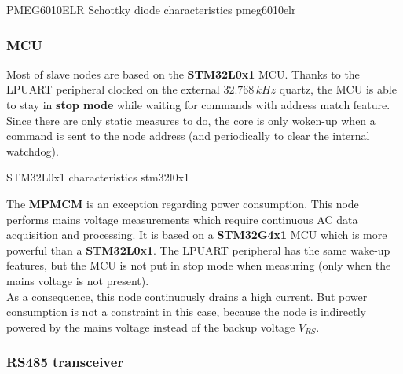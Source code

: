 {PMEG6010ELR Schottky diode characteristics}
{pmeg6010elr}

\subsubsection{MCU}

Most of slave nodes are based on the \textbf{STM32L0x1} MCU. Thanks to the LPUART peripheral clocked on the external $ 32.768\,kHz $ quartz, the MCU is able to stay in \textbf{stop mode} while waiting for commands with address match feature. Since there are only static measures to do, the core is only woken-up when a command is sent to the node address (and periodically to clear the internal watchdog). \pfs

{STM32L0x1 characteristics}
{stm32l0x1}

The \textbf{MPMCM} is an exception regarding power consumption. This node performs mains voltage measurements which require continuous AC data acquisition and processing. It is based on a \textbf{STM32G4x1} MCU which is more powerful than a \textbf{STM32L0x1}. The LPUART peripheral has the same wake-up features, but the MCU is not put in stop mode when measuring (only when the mains voltage is not present). \\
As a consequence, this node continuously drains a high current. But power consumption is not a constraint in this case, because the node is indirectly powered by the mains voltage instead of the backup voltage $ V_{RS} $.

\newpage

\subsubsection{RS485 transceiver}

